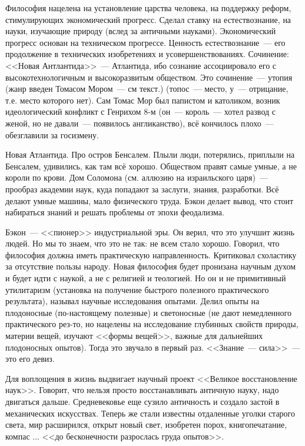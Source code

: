 Философия нацелена на установление царства человека, на поддержку реформ, стимулирующих экономический прогресс. Сделал ставку на естествознание, на науки, изучающие природу (вслед за античными науками). Экономический прогресс основан на техническом прогрессе. Ценность естествознание~--- его продолжение в технических изобретениях и усовершенствованиях. Сочинение: <<Новая Антлантида>>~--- Атлантида, ибо сознание ассоциировало его с высокотехнологичным и высокоразвитым обществом. Это сочинение~--- утопия (жанр введен Томасом Мором~--- см текст.) (топос~--- место, у~--- отрицание, т.е. место которого нет). Сам Томас Мор был папистом и католиком, возник идеологический конфликт с Генрихом 8-м (он~--- король~--- хотел развод с женой, но не давали~--- появилось англиканство), всё кончилось плохо~--- обезглавили за госизмену.

Новая Атлантида. Про остров Бенсалем. Плыли люди, потерялись, приплыли на Бенсалем, удивились, как там всё хорошо. Обществом правят самые умные, а не короли по крови. Дом Соломона (см. аллюзию на израильского царя)~--- прообраз академии наук, куда попадают за заслуги, знания, разработки. Всё делают умные машины, мало физического труда. Бэкон делает вывод, что стоит набираться знаний и решать проблемы от эпохи феодализма. 

Бэкон~--- <<пионер>> индустриальной эры. Он верил, что это улучшит жизнь людей. Но мы то знаем, что это не так: не всем стало хорошо.
Говорил, что философия должна иметь практическую направленность. Критиковал схоластику за отсутствие пользы народу. Новая философия будет пронизана научным духом и будет идти с наукой, а не с религией и теологией. Но он и не примитивный утилитаризм (установка на получение быстрого полезного практического результата), называл научные исследования опытами. Делил опыты на плодоносные (по-настоящему полезные) и светоносные (не дают немедленного практического рез-то, но нацелены на исследование глубинных свойств природы, материи вещей, изучают <<формы вещей>>, важные для дальнейших плодоносных опытов). Тогда это звучало в первый раз. <<Знание~--- сила>>~--- это его девиз. 

Для воплощения в жизнь выдвигает научный проект <<Великое восстановление наук>>. Говорит, что нельзя просто восстанавливать античную науку, надо двигаться дальше. Средневековье еще сузило античность и создало застой в механических искусствах. Теперь же стали известны отдаленные уголки старого света, мир расширился, открыт новый свет, изобретен порох, книгопечатание, компас ... <<до бесконечности разрослась груда опытов>>.

